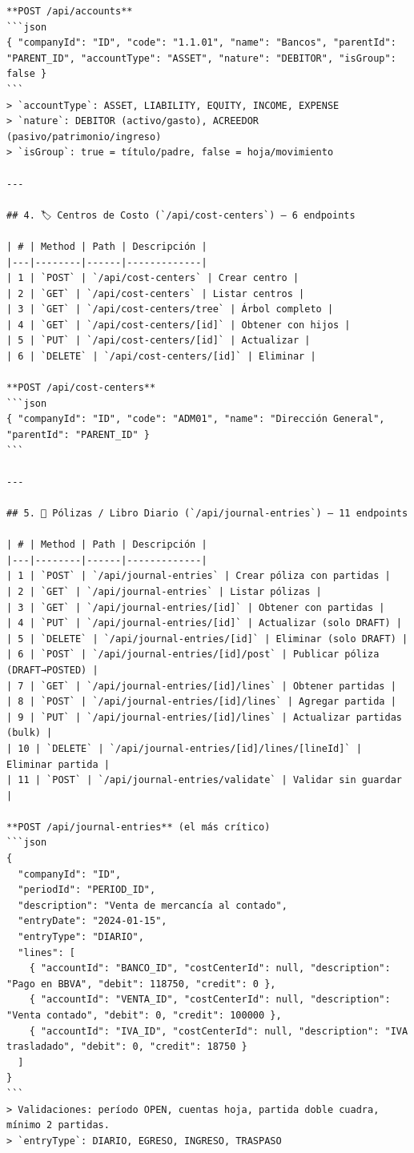\documentclass[12pt, a4paper, oneside]{book}
\begin{document}
\begin{lstlisting}
**POST /api/accounts**
```json
{ "companyId": "ID", "code": "1.1.01", "name": "Bancos", "parentId": "PARENT_ID", "accountType": "ASSET", "nature": "DEBITOR", "isGroup": false }
```
> `accountType`: ASSET, LIABILITY, EQUITY, INCOME, EXPENSE  
> `nature`: DEBITOR (activo/gasto), ACREEDOR (pasivo/patrimonio/ingreso)  
> `isGroup`: true = título/padre, false = hoja/movimiento

---

## 4. 🏷️ Centros de Costo (`/api/cost-centers`) — 6 endpoints

| # | Method | Path | Descripción |
|---|--------|------|-------------|
| 1 | `POST` | `/api/cost-centers` | Crear centro |
| 2 | `GET` | `/api/cost-centers` | Listar centros |
| 3 | `GET` | `/api/cost-centers/tree` | Árbol completo |
| 4 | `GET` | `/api/cost-centers/[id]` | Obtener con hijos |
| 5 | `PUT` | `/api/cost-centers/[id]` | Actualizar |
| 6 | `DELETE` | `/api/cost-centers/[id]` | Eliminar |

**POST /api/cost-centers**
```json
{ "companyId": "ID", "code": "ADM01", "name": "Dirección General", "parentId": "PARENT_ID" }
```

---

## 5. 📝 Pólizas / Libro Diario (`/api/journal-entries`) — 11 endpoints

| # | Method | Path | Descripción |
|---|--------|------|-------------|
| 1 | `POST` | `/api/journal-entries` | Crear póliza con partidas |
| 2 | `GET` | `/api/journal-entries` | Listar pólizas |
| 3 | `GET` | `/api/journal-entries/[id]` | Obtener con partidas |
| 4 | `PUT` | `/api/journal-entries/[id]` | Actualizar (solo DRAFT) |
| 5 | `DELETE` | `/api/journal-entries/[id]` | Eliminar (solo DRAFT) |
| 6 | `POST` | `/api/journal-entries/[id]/post` | Publicar póliza (DRAFT→POSTED) |
| 7 | `GET` | `/api/journal-entries/[id]/lines` | Obtener partidas |
| 8 | `POST` | `/api/journal-entries/[id]/lines` | Agregar partida |
| 9 | `PUT` | `/api/journal-entries/[id]/lines` | Actualizar partidas (bulk) |
| 10 | `DELETE` | `/api/journal-entries/[id]/lines/[lineId]` | Eliminar partida |
| 11 | `POST` | `/api/journal-entries/validate` | Validar sin guardar |

**POST /api/journal-entries** (el más crítico)
```json
{
  "companyId": "ID",
  "periodId": "PERIOD_ID",
  "description": "Venta de mercancía al contado",
  "entryDate": "2024-01-15",
  "entryType": "DIARIO",
  "lines": [
    { "accountId": "BANCO_ID", "costCenterId": null, "description": "Pago en BBVA", "debit": 118750, "credit": 0 },
    { "accountId": "VENTA_ID", "costCenterId": null, "description": "Venta contado", "debit": 0, "credit": 100000 },
    { "accountId": "IVA_ID", "costCenterId": null, "description": "IVA trasladado", "debit": 0, "credit": 18750 }
  ]
}
```
> Validaciones: período OPEN, cuentas hoja, partida doble cuadra, mínimo 2 partidas.  
> `entryType`: DIARIO, EGRESO, INGRESO, TRASPASO


\end{lstlisting}
\end{document}
